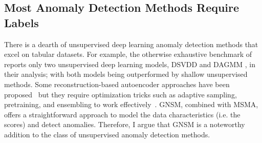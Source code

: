 



\subsection*{Most Anomaly Detection Methods Require Labels}

There is a dearth of unsupervised deep learning anomaly detection methods that excel on tabular datasets. For example, the otherwise exhaustive benchmark of~\cite{han2022adbench} reports only two unsupervised deep learning models, DSVDD \cite{pmlr-v80-ruff18a} and DAGMM \cite{zong2018deep}, in their analysis; with both models being outperformed by shallow unsupervised methods. Some reconstruction-based autoencoder approaches have been proposed~\cite{hawkins2002outlier} but they require optimization tricks such as adaptive sampling, pretraining, and ensembling to work effectively~\cite{chen2017outlier}. 
GNSM, combined with MSMA, offers a straightforward approach to model the data characteristics (i.e. the scores) and detect anomalies. Therefore, I argue that GNSM is a noteworthy addition to the class of unsupervised anomaly detection methods.

